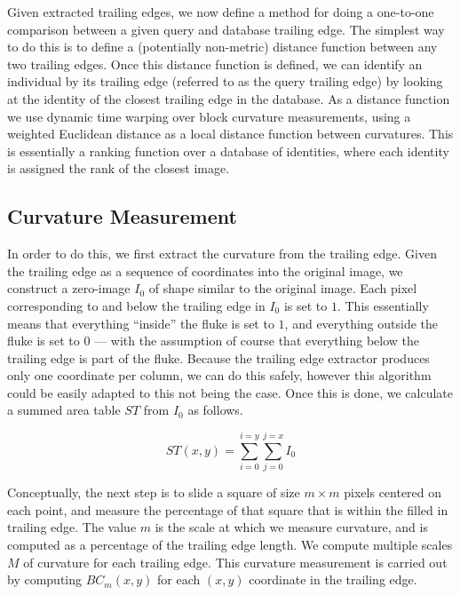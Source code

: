 Given extracted trailing edges, we now define a method for doing a one-to-one comparison between a given query and database trailing edge.
The simplest way to do this is to define a (potentially non-metric) distance function between any two trailing edges.
Once this distance function is defined, we can identify an individual by its trailing edge (referred to as the query trailing edge) by looking at the identity of the closest trailing edge in the database.
As a distance function we use dynamic time warping over block curvature measurements, using a weighted Euclidean distance as a local distance function between curvatures.
This is essentially a ranking function over a database of identities, where each identity is assigned the rank of the closest image.

\subsection{Curvature Measurement}

In order to do this, we first extract the curvature from the trailing edge.
Given the trailing edge as a sequence of coordinates into the original image, we construct a zero-image $I_0$ of shape similar to the original image.
Each pixel corresponding to and below the trailing edge in $I_0$ is set to $1$.
This essentially means that everything ``inside'' the fluke is set to $1$, and everything outside the fluke is set to $0$ --- with the assumption of course that everything below the trailing edge is part of the fluke.
Because the trailing edge extractor produces only one coordinate per column, we can do this safely, however this algorithm could be easily adapted to this not being the case.
Once this is done, we calculate a summed area table \cite{crow1984summed} $ST$ from $I_0$ as follows.

\begin{equation} \label{eqn:sat}
ST(x,y) = \sum_{i=0}^{i=y}\sum_{j=0}^{j=x} I_0 
\end{equation}

Conceptually, the next step is to slide a square of size $m \times m$ pixels centered on each point, and measure the percentage of that square that is within the filled in trailing edge.
The value $m$ is the scale at which we measure curvature, and is computed as a percentage of the trailing edge length.
We compute multiple scales $M$ of curvature for each trailing edge.
This curvature measurement is carried out by computing $BC_m(x, y)$ for each $(x, y)$ coordinate in the trailing edge.

